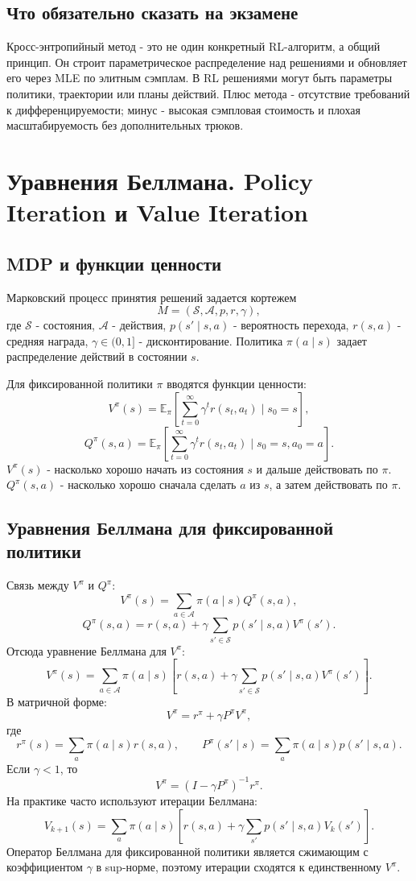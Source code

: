 \documentclass[11pt,a4paper]{article}
\newcommand{\E}{\mathbb{E}}
\newcommand{\1}{\mathbf{1}}
\newcommand{\cS}{\mathcal S}
\newcommand{\cA}{\mathcal A}
\begin{document}
\subsection*{Что обязательно сказать на экзамене}
Кросс-энтропийный метод - это не один конкретный RL-алгоритм, а общий принцип. Он строит параметрическое распределение над решениями и обновляет его через MLE по элитным сэмплам. В RL решениями могут быть параметры политики, траектории или планы действий. Плюс метода - отсутствие требований к дифференцируемости; минус - высокая сэмпловая стоимость и плохая масштабируемость без дополнительных трюков.

\newpage
\section{Уравнения Беллмана. Policy Iteration и Value Iteration}

\subsection*{MDP и функции ценности}
Марковский процесс принятия решений задается кортежем
\[
    M=(\cS,\cA,p,r,\gamma),
\]
где $\cS$ - состояния, $\cA$ - действия, $p(s'\mid s,a)$ - вероятность перехода, $r(s,a)$ - средняя награда, $\gamma\in(0,1]$ - дисконтирование. Политика $\pi(a\mid s)$ задает распределение действий в состоянии $s$.

Для фиксированной политики $\pi$ вводятся функции ценности:
\[
    V^\pi(s)=\E_\pi\left[\sum_{t=0}^\infty \gamma^t r(s_t,a_t)\mid s_0=s\right],
\]
\[
    Q^\pi(s,a)=\E_\pi\left[\sum_{t=0}^\infty \gamma^t r(s_t,a_t)\mid s_0=s,a_0=a\right].
\]
$V^\pi(s)$ - насколько хорошо начать из состояния $s$ и дальше действовать по $\pi$. $Q^\pi(s,a)$ - насколько хорошо сначала сделать $a$ из $s$, а затем действовать по $\pi$.

\subsection*{Уравнения Беллмана для фиксированной политики}
Связь между $V^\pi$ и $Q^\pi$:
\[
    V^\pi(s)=\sum_{a\in\cA}\pi(a\mid s)Q^\pi(s,a),
\]
\[
    Q^\pi(s,a)=r(s,a)+\gamma\sum_{s'\in\cS}p(s'\mid s,a)V^\pi(s').
\]
Отсюда уравнение Беллмана для $V^\pi$:
\[
    V^\pi(s)=\sum_{a\in\cA}\pi(a\mid s)\left[r(s,a)+\gamma\sum_{s'\in\cS}p(s'\mid s,a)V^\pi(s')\right].
\]
В матричной форме:
\[
    V^\pi = r^\pi + \gamma P^\pi V^\pi,
\]
где
\[
    r^\pi(s)=\sum_a\pi(a\mid s)r(s,a),
    \qquad
    P^\pi(s'\mid s)=\sum_a\pi(a\mid s)p(s'\mid s,a).
\]
Если $\gamma<1$, то
\[
    V^\pi=(I-\gamma P^\pi)^{-1}r^\pi.
\]
На практике часто используют итерации Беллмана:
\[
    V_{k+1}(s)=\sum_a\pi(a\mid s)\left[r(s,a)+\gamma\sum_{s'}p(s'\mid s,a)V_k(s')\right].
\]
Оператор Беллмана для фиксированной политики является сжимающим с коэффициентом $\gamma$ в sup-норме, поэтому итерации сходятся к единственному $V^\pi$.
\end{document}
